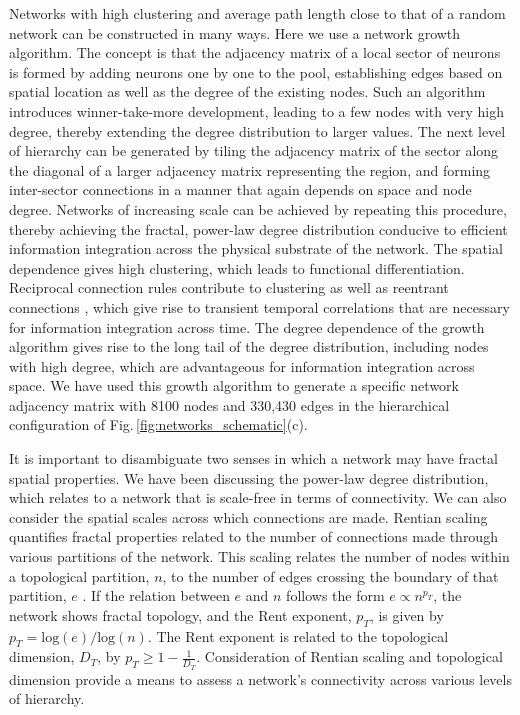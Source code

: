 \documentclass[aip,amsmath,amssymb,reprint,nofootinbib]{revtex4-1}
\begin{document}
Networks with high clustering and average path length close to that of a random network can be constructed in many ways. Here we use a network growth algorithm. The concept is that the adjacency matrix of a local sector of neurons is formed by adding neurons one by one to the pool, establishing edges based on spatial location as well as the degree of the existing nodes. Such an algorithm introduces winner-take-more development, leading to a few nodes with very high degree, thereby extending the degree distribution to larger values. The next level of hierarchy can be generated by tiling the adjacency matrix of the sector along the diagonal of a larger adjacency matrix representing the region, and forming inter-sector connections in a manner that again depends on space and node degree. Networks of increasing scale can be achieved by repeating this procedure, thereby achieving the fractal, power-law degree distribution conducive to efficient information integration across the physical substrate of the network. The spatial dependence gives high clustering, which leads to functional differentiation. Reciprocal connection rules contribute to clustering as well as reentrant connections \cite{spto2000}, which give rise to transient temporal correlations that are necessary for information integration across time. The degree dependence of the growth algorithm gives rise to the long tail of the degree distribution, including nodes with high degree, which are advantageous for information integration across space. We have used this growth algorithm to generate a specific network adjacency matrix with 8100 nodes and 330,430 edges in the hierarchical configuration of Fig.\,\ref{fig:networks_schematic}(c). 

It is important to disambiguate two senses in which a network may have fractal spatial properties. We have been discussing the power-law degree distribution, which relates to a network that is scale-free in terms of connectivity. We can also consider the spatial scales across which connections are made. Rentian scaling quantifies fractal properties related to the number of connections made through various partitions of the network. This scaling relates the number of nodes within a topological partition, $n$, to the number of edges crossing the boundary of that partition, $e$ \cite{bagr2010}. If the relation between $e$ and $n$ follows the form $e\propto n^{p_T}$, the network shows fractal topology, and the Rent exponent, $p_T$, is given by $p_T = \mathrm{log}(e)/\mathrm{log}(n)$. The Rent exponent is related to the topological dimension, $D_T$, by $p_T \ge 1-\frac{1}{D_T}$. Consideration of Rentian scaling and topological dimension provide a means to assess a network's connectivity across various levels of hierarchy. 
\end{document}
